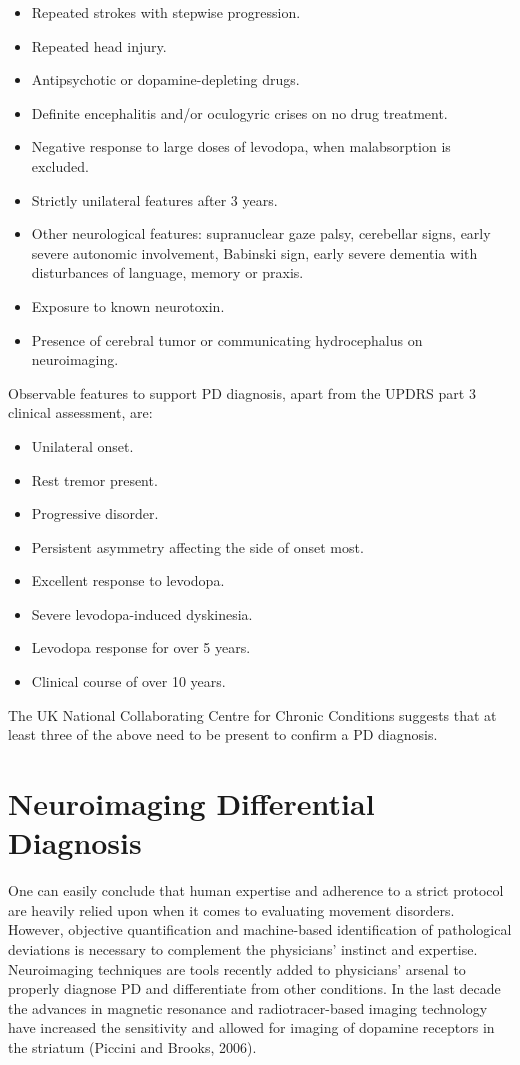\begin{itemize}
\item Repeated strokes with stepwise progression.
\item Repeated head injury.
\item Antipsychotic or dopamine-depleting drugs.
\item Definite encephalitis and/or oculogyric crises on no drug treatment.
\item Negative response to large doses of levodopa, when malabsorption is excluded.
\item Strictly unilateral features after 3 years.
\item Other neurological features: supranuclear gaze palsy, cerebellar signs, early severe autonomic involvement, Babinski sign, early severe dementia with disturbances of language, memory or praxis.
\item Exposure to known neurotoxin.
\item Presence of cerebral tumor or communicating hydrocephalus on neuroimaging.
\end{itemize}

\noindent
Observable features to support \gls{PD} diagnosis, apart from the \gls{UPDRS} part 3 clinical assessment, are:

\begin{itemize}
\item Unilateral onset.
\item Rest tremor present.
\item Progressive disorder.
\item Persistent asymmetry affecting the side of onset most.
\item Excellent response to levodopa.
\item Severe levodopa-induced dyskinesia.
\item Levodopa response for over 5 years.
\item Clinical course of over 10 years.
\end{itemize}

The UK National Collaborating Centre for Chronic Conditions suggests that at least three of the above need to be present to confirm a \gls{PD} diagnosis. 


\section{Neuroimaging Differential Diagnosis}
\label{sec:spectDat}
One can easily conclude that human expertise and adherence to a strict protocol are heavily relied upon when it comes to evaluating movement disorders. However, objective quantification and machine-based identification of pathological deviations is necessary to complement the physicians' instinct and expertise. Neuroimaging techniques are tools recently added to physicians' arsenal to properly diagnose \gls{PD} and differentiate from other conditions. In the last decade the advances in magnetic resonance and radiotracer-based imaging technology have increased the sensitivity and allowed for imaging of dopamine receptors in the striatum (Piccini and Brooks, 2006).

